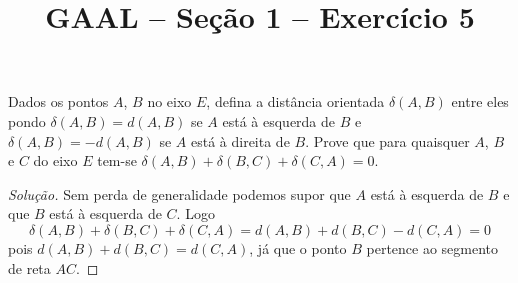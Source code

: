 \documentclass[a4paper,11pt]{article}
\title{GAAL -- Seção 1 -- Exercício 5}
\author{\empty}
\date{\empty}
\newcommand\onlyinsubfileone\maketitle
\begin{document}
\onlyinsubfileone

\begin{exercicio-gaal}[E5.S1]
  Dados os pontos $A$, $B$ no eixo $E$, defina a distância orientada $\delta(A,B)$ entre eles pondo $\delta(A,B) = d(A,B)$ se $A$ está à esquerda de $B$ e $\delta(A,B) = -d(A,B)$ se $A$ está à direita de $B$.
  Prove que para quaisquer $A$, $B$ e $C$ do eixo $E$ tem-se $\delta(A,B) + \delta(B,C) + \delta (C,A) = 0$.
\end{exercicio-gaal}

\begin{proof}[Solução]
  Sem perda de generalidade podemos supor que $A$ está à esquerda de $B$ e que $B$ está à esquerda de $C$.
  Logo
  \[
    \delta(A,B) + \delta(B,C) + \delta (C,A) = d(A,B) + d(B,C) - d(C,A) = 0
  \]
  pois $d(A,B) + d(B,C) = d(C,A)$, já que o ponto $B$ pertence ao segmento de reta $AC$.
\end{proof}
\end{document}
